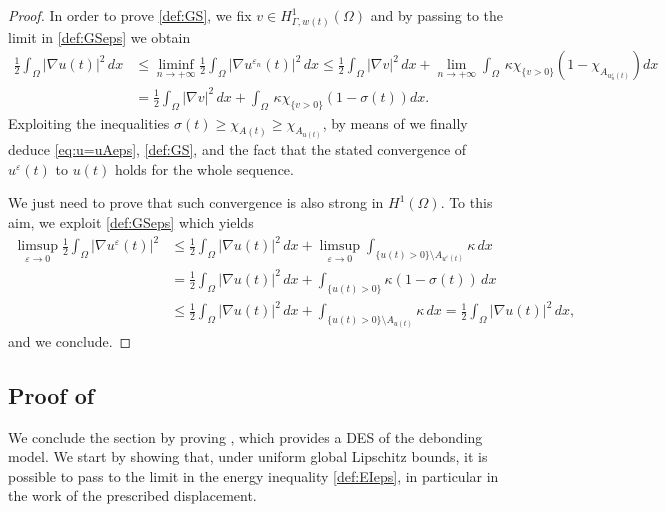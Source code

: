 \documentclass[a4paper,11pt,reqno]{amsart}
\numberwithin{equation}{section}
\theoremstyle{definition}
\theoremstyle{remark}
\begin{document}
\begin{proof}
In order to prove \ref{def:GS}, we fix $v\in H^1_{\Gamma,w(t)}(\Omega)$ and by passing to the limit in \ref{def:GSeps} we obtain
\begin{align}
    \frac 12 \int_\Omega |\nabla u(t)|^2\, dx&\le \liminf\limits_{n\to +\infty}\frac 12 \int_\Omega |\nabla u^{\varepsilon_n}(t)|^2\, dx\le \frac 12 \int_\Omega |\nabla v|^2\, dx+\lim\limits_{n\to {+}\infty}\int_\Omega \, \kappa \chi_{\{v>0\}}(1{-}\chi_{A_{u^\varepsilon_n(t)}}) dx\\
    &= \frac 12 \int_\Omega |\nabla v|^2\, dx+\int_\Omega \, \kappa \chi_{\{v>0\}}(1-\sigma(t)) dx.
\end{align}
Exploiting the inequalities $\sigma(t)\ge \chi_{A(t)}\ge \chi_{A_{u(t)}}$, by means of  we finally deduce \eqref{eq:u=uAeps}, \ref{def:GS}, and the fact that the stated convergence of $u^\varepsilon(t)$ to $u(t)$ holds for the whole sequence.

We just need to prove that such convergence is also strong in $H^1(\Omega)$. To this aim, we exploit \ref{def:GSeps} which yields
\begin{align}
    \limsup\limits_{\varepsilon\to 0}\frac 12 \int_\Omega |\nabla u^{\varepsilon}(t)|^2&\le  \frac 12 \int_\Omega |\nabla u(t)|^2\, dx+\limsup\limits_{\varepsilon\to 0}\int_{\{u(t)>0\}\setminus A_{u^\varepsilon(t)}}\kappa \, dx\\
    &=\frac 12 \int_\Omega |\nabla u(t)|^2\, dx+\int_{\{u(t)>0\}}\kappa (1-\sigma(t))\, dx\\
    &\le \frac 12 \int_\Omega |\nabla u(t)|^2\, dx+\int_{\{u(t)>0\}\setminus A_{u(t)}}\kappa \, dx=\frac 12 \int_\Omega |\nabla u(t)|^2\, dx,
\end{align}
and we conclude.
\end{proof}

\subsection{Proof of }
We conclude the section by proving , which provides a DES of the debonding model. We start by showing that, under uniform global Lipschitz bounds, it is possible to pass to the limit in the energy inequality \ref{def:EIeps}, in particular in the work of the prescribed displacement.
\end{document}
